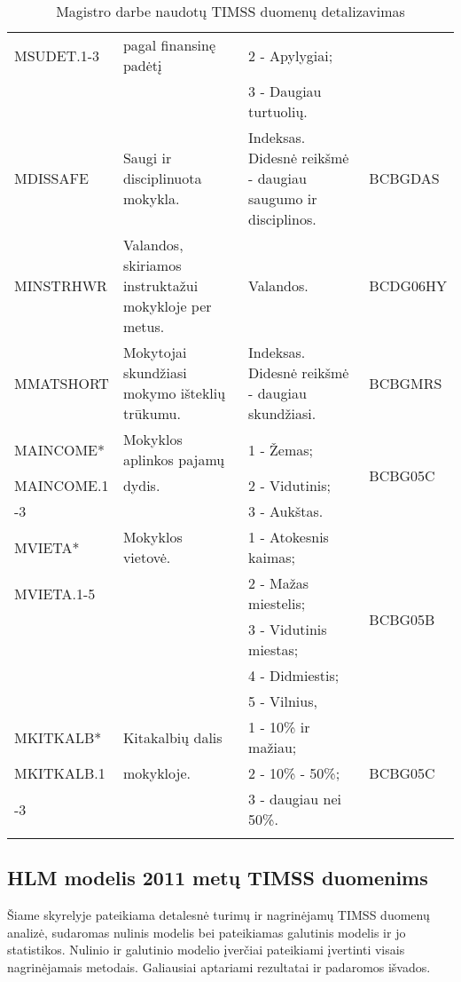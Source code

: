 \documentclass[12pt,a4paper]{article}
\begin{document}
\begin{small}
\begin{longtable}{| p{} | p{5cm} | p{5cm} | p{} |}
MSUDET.1-3 & pagal finansinę padėtį & 2 - Apylygiai; & \\
& & 3 - Daugiau turtuolių. & \\ \hline
MDISSAFE & Saugi ir disciplinuota mokykla. & Indeksas. Didesnė reikšmė - daugiau saugumo ir disciplinos. &BCBGDAS\\ \hline
MINSTRHWR & Valandos, skiriamos instruktažui mokykloje per metus. & Valandos. &BCDG06HY\\ \hline
MMATSHORT & Mokytojai skundžiasi mokymo išteklių trūkumu. & Indeksas. Didesnė reikšmė - daugiau skundžiasi. &BCBGMRS\\ \hline
MAINCOME* & Mokyklos aplinkos pajamų & 1 - Žemas; & \multirow{3}{*}{BCBG05C}\\
MAINCOME.1& dydis. & 2 - Vidutinis; & \\
-3& & 3 - Aukštas. & \\ \hline
MVIETA* & Mokyklos vietovė. & 1 - Atokesnis kaimas; & \multirow{5}{*}{BCBG05B}\\
MVIETA.1-5& & 2 - Mažas miestelis; & \\
& & 3 - Vidutinis miestas; & \\
& & 4 - Didmiestis; & \\
& & 5 - Vilnius, & \\ \hline
MKITKALB* & Kitakalbių dalis & 1 - 10\% ir mažiau; & \multirow{3}{*}{BCBG05C}\\
MKITKALB.1& mokykloje. & 2 - 10\% - 50\%; & \\
-3& & 3 - daugiau nei 50\%. & \\ \hline
\caption{Magistro darbe naudotų TIMSS duomenų detalizavimas}
\label{table:duom}
\end{longtable}
\end{small}


\subsection{HLM modelis 2011 metų TIMSS duomenims}

\indent Šiame skyrelyje pateikiama detalesnė turimų ir nagrinėjamų TIMSS duomenų analizė, sudaromas nulinis modelis bei pateikiamas galutinis modelis ir jo statistikos. Nulinio ir galutinio modelio įverčiai pateikiami įvertinti visais nagrinėjamais metodais. Galiausiai aptariami rezultatai ir padaromos išvados.
\end{document}
